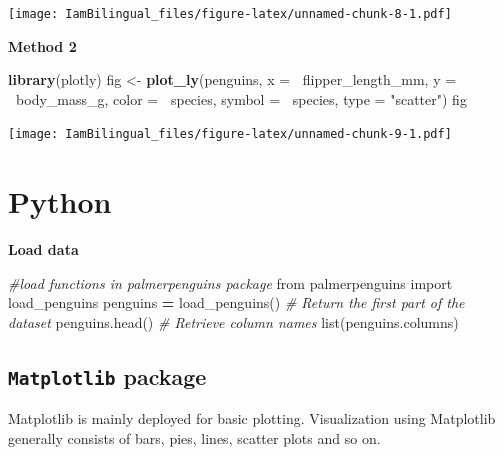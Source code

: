 \documentclass[]{book}
\newenvironment{Shaded}{\begin{snugshade}}{\end{snugshade}}
\newcommand{\BuiltInTok}[1]{#1}
\newcommand{\CommentTok}[1]{\textcolor[rgb]{0.56,0.35,0.01}{\textit{#1}}}
\newcommand{\DataTypeTok}[1]{\textcolor[rgb]{0.13,0.29,0.53}{#1}}
\newcommand{\ImportTok}[1]{#1}
\newcommand{\KeywordTok}[1]{\textcolor[rgb]{0.13,0.29,0.53}{\textbf{#1}}}
\newcommand{\NormalTok}[1]{#1}
\newcommand{\OperatorTok}[1]{\textcolor[rgb]{0.81,0.36,0.00}{\textbf{#1}}}
\newcommand{\StringTok}[1]{\textcolor[rgb]{0.31,0.60,0.02}{#1}}
\begin{document}
\texttt{[image: IamBilingual\_files/figure-latex/unnamed-chunk-8-1.pdf]}

\textbf{Method 2}

\begin{Shaded}
\begin{Highlighting}[]
\KeywordTok{library}\NormalTok{(plotly)}
\NormalTok{fig <-}\StringTok{ }\KeywordTok{plot_ly}\NormalTok{(penguins, }
               \DataTypeTok{x =} \OperatorTok{~}\NormalTok{flipper_length_mm,}
               \DataTypeTok{y =} \OperatorTok{~}\NormalTok{body_mass_g, }
               \DataTypeTok{color =} \OperatorTok{~}\NormalTok{species,}
               \DataTypeTok{symbol =} \OperatorTok{~}\NormalTok{species,}
               \DataTypeTok{type =} \StringTok{"scatter"}\NormalTok{)}
\NormalTok{fig}
\end{Highlighting}
\end{Shaded}

\texttt{[image: IamBilingual\_files/figure-latex/unnamed-chunk-9-1.pdf]}

\hypertarget{python-5}{%
\section{Python}\label{python-5}}

\textbf{Load data}

\begin{Shaded}
\begin{Highlighting}[]
\CommentTok{#load functions in palmerpenguins package}
\ImportTok{from}\NormalTok{ palmerpenguins }\ImportTok{import}\NormalTok{ load_penguins}
\NormalTok{penguins }\OperatorTok{=}\NormalTok{ load_penguins()}
\CommentTok{# Return the first part of the dataset}
\NormalTok{penguins.head()}
\CommentTok{# Retrieve column names}
\BuiltInTok{list}\NormalTok{(penguins.columns)}
\end{Highlighting}
\end{Shaded}

\hypertarget{matplotlib-package}{%
\subsection{\texorpdfstring{\texttt{Matplotlib} package}{Matplotlib package}}\label{matplotlib-package}}

Matplotlib is mainly deployed for basic plotting. Visualization using Matplotlib generally consists of bars, pies, lines, scatter plots and so on.
\end{document}
